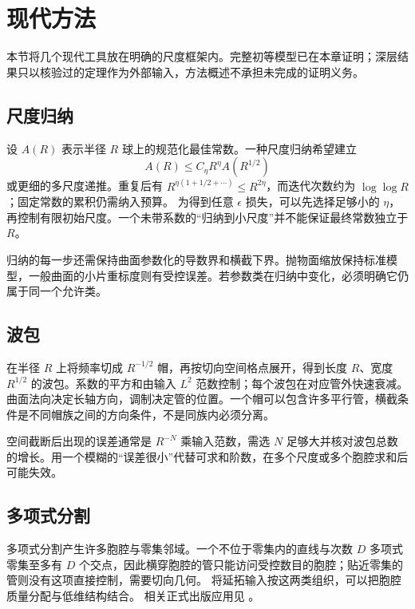 \section{现代方法}
\label{b2:sec:2505}

本节将几个现代工具放在明确的尺度框架内。完整初等模型已在本章证明；深层结果只以核验过的定理作为外部输入，方法概述不承担未完成的证明义务。

\subsection{尺度归纳}
\label{b2:subsec:250501}

设 \(A(R)\) 表示半径 \(R\) 球上的规范化最佳常数。一种尺度归纳希望建立
\[
 A(R)\le C_\eta R^\eta A(R^{1/2})
\]
或更细的多尺度递推。重复后有
\(R^{\eta(1+1/2+\cdots)}\le R^{2\eta}\)，而迭代次数约为 \(\log\log R\)；固定常数的累积仍需纳入预算。
为得到任意 \(\epsilon\) 损失，可以先选择足够小的 \(\eta\)，再控制有限初始尺度。一个未带系数的“归纳到小尺度”并不能保证最终常数独立于 \(R\)。

\ProseParagraphBreak
归纳的每一步还需保持曲面参数化的导数界和横截下界。抛物面缩放保持标准模型，一般曲面的小片重标度则有受控误差。若参数类在归纳中变化，必须明确它仍属于同一个允许类。

\subsection{波包}
\label{b2:subsec:250502}

在半径 \(R\) 上将频率切成 \(R^{-1/2}\) 帽，再按切向空间格点展开，得到长度 \(R\)、宽度 \(R^{1/2}\) 的波包。系数的平方和由输入 \(L^2\) 范数控制；每个波包在对应管外快速衰减。
曲面法向决定长轴方向，调制决定管的位置。一个帽可以包含许多平行管，横截条件是不同帽族之间的方向条件，不是同族内必须分离。

\ProseParagraphBreak
空间截断后出现的误差通常是 \(R^{-N}\) 乘输入范数，需选 \(N\) 足够大并核对波包总数的增长。用一个模糊的“误差很小”代替可求和阶数，在多个尺度或多个胞腔求和后可能失效。

\subsection{多项式分割}
\label{b2:subsec:250503}

多项式分割产生许多胞腔与零集邻域。一个不位于零集内的直线与次数 \(D\) 多项式零集至多有 \(D\) 个交点，因此横穿胞腔的管只能访问受控数目的胞腔；贴近零集的管则没有这项直接控制，需要切向几何。
将延拓输入按这两类组织，可以把胞腔质量分配与低维结构结合。
相关正式出版应用见 \cite{Guth2016Restriction}。

